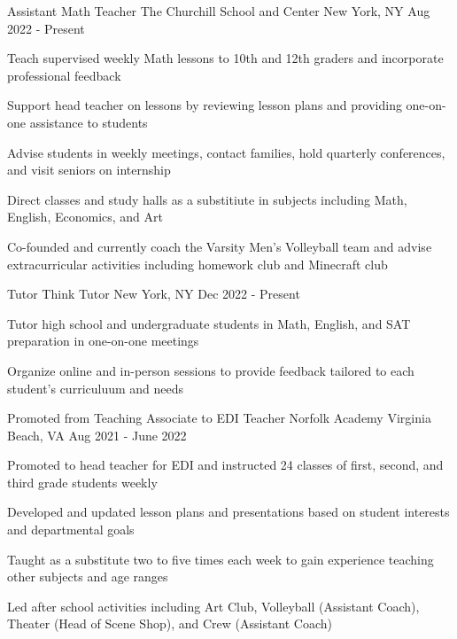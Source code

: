 \begin{cventries}
  \cventry
  {Assistant Math Teacher}
  {The Churchill School and Center}
  {New York, NY}
  {Aug 2022 - Present}
  {
    \begin{cvitems}
      \item {Teach supervised weekly Math lessons to 10th and 12th graders and incorporate professional feedback}
      \item {Support head teacher on lessons by reviewing lesson plans and providing one-on-one assistance to students}
      \item {Advise students in weekly meetings, contact families, hold quarterly conferences, and visit seniors on internship}
      \item {Direct classes and study halls as a substitiute in subjects including Math, English, Economics, and Art}
      \item {Co-founded and currently coach the Varsity Men's Volleyball team and advise extracurricular activities including homework club and Minecraft club}
    \end{cvitems}
  }

  \cventry
  {Tutor}
  {Think Tutor}
  {New York, NY}
  {Dec 2022 - Present}
  {
    \begin{cvitems}
      \item {Tutor high school and undergraduate students in Math, English, and SAT preparation in one-on-one meetings}
      \item {Organize online and in-person sessions to provide feedback tailored to each student's curriculuum and needs}
    \end{cvitems}
  }

  \cventry
  {Promoted from Teaching Associate to EDI Teacher}
  {Norfolk Academy}
  {Virginia Beach, VA}
  {Aug 2021 - June 2022}
  {
    \begin{cvitems}
      \item {Promoted to head teacher for EDI and instructed 24 classes of first, second, and third grade students weekly}
      \item {Developed and updated lesson plans and presentations based on student interests and departmental goals}
      \item {Taught as a substitute two to five times each week to gain experience teaching other subjects and age ranges}
      \item {Led after school activities including Art Club, Volleyball (Assistant Coach), Theater (Head of Scene Shop), and Crew (Assistant Coach)}
    \end{cvitems}
  }


\end{cventries}
